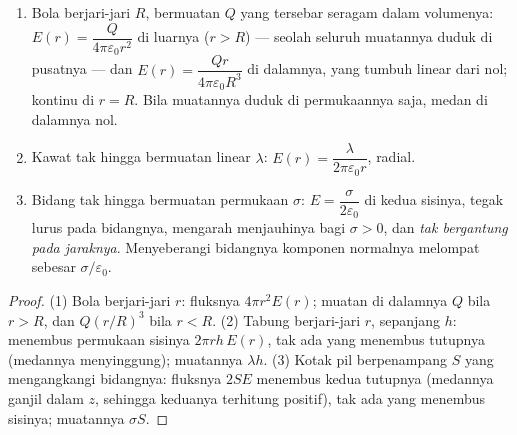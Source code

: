 \begin{proposition}\label{prop:b1:electrostatics-gauss:three}
\begin{enumerate}
  \item Bola berjari-jari $R$, bermuatan $Q$ yang tersebar seragam dalam
        volumenya: $E(r) = \dfrac{Q}{4\pi\varepsilon_0r^2}$ di luarnya ($r > R$) ---
        seolah seluruh muatannya duduk di pusatnya --- dan $E(r) =
        \dfrac{Qr}{4\pi\varepsilon_0R^3}$ di dalamnya, yang tumbuh linear dari nol;
        kontinu di $r = R$. Bila muatannya duduk di permukaannya saja,
        medan di dalamnya nol.
  \item Kawat tak hingga bermuatan linear $\lambda$: $E(r) =
        \dfrac{\lambda}{2\pi\varepsilon_0 r}$, radial.
  \item Bidang tak hingga bermuatan permukaan $\sigma$: $E = \dfrac{\sigma}{2\varepsilon_0}$
        di kedua sisinya, tegak lurus pada bidangnya, mengarah menjauhinya bagi
        $\sigma > 0$, dan \emph{tak bergantung pada jaraknya}. Menyeberangi bidangnya
        komponen normalnya melompat sebesar $\sigma/\varepsilon_0$.
\end{enumerate}
\end{proposition}

\begin{proof}
(1) Bola berjari-jari $r$: fluksnya $4\pi r^2E(r)$; muatan di dalamnya $Q$ bila
$r > R$, dan $Q(r/R)^3$ bila $r < R$. (2) Tabung berjari-jari $r$, sepanjang $h$:
 menembus permukaan sisinya $2\pi rh\,E(r)$, tak ada yang menembus tutupnya
(medannya menyinggung); muatannya $\lambda h$. (3) Kotak pil berpenampang $S$
yang mengangkangi bidangnya: fluksnya $2SE$ menembus kedua tutupnya (medannya ganjil
dalam $z$, sehingga keduanya terhitung positif), tak ada yang menembus sisinya; muatannya
$\sigma S$.
\end{proof}

